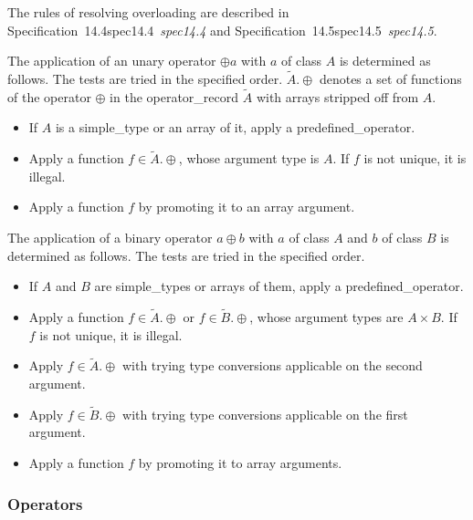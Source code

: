 \documentclass[10pt,b5paper]{article}
\def\specrefx#1#2{Specification~#1\ifx\relax#2\relax{}\else~{\it{}#2}\fi}
\def\specref#1{\specrefx{#1}{\csname spec#1\endcsname}}
\begin{document}
The rules of resolving overloading are described in \specref{14.4}\/
and \specref{14.5}.

The application of an unary operator $\oplus a$ with $a$ of class $A$
is determined as follows.  The tests are tried in the specified order.
$\tilde{A}.\oplus$ denotes a set of functions of the operator $\oplus$
in the operator_record $\tilde{A}$ with arrays stripped off from $A$.

\begin{itemize}

\item If $A$ is a simple_type or an array of it, apply a
predefined_operator.

\item Apply a function $f \in \tilde{A}.\oplus$, whose argument type
is $A$.  If $f$ is not unique, it is illegal.

\item Apply a function $f$ by promoting it to an array argument.

\end{itemize}

The application of a binary operator $a \oplus b$ with $a$ of class
$A$ and $b$ of class $B$ is determined as follows.  The tests are
tried in the specified order.

\begin{itemize}

\item If $A$ and $B$ are simple_types or arrays of them, apply a
predefined_operator.

\item Apply a function $f \in \tilde{A}.\oplus$ or $f \in
\tilde{B}.\oplus$, whose argument types are $A\times B$.  If $f$ is
not unique, it is illegal.

\item Apply $f \in \tilde{A}.\oplus$ with trying type conversions applicable on
the second argument.

\item Apply $f \in \tilde{B}.\oplus$ with trying type conversions
applicable on the first argument.

\item Apply a function $f$ by promoting it to array arguments.

\end{itemize}

\subsubsection*{Operators}
\end{document}
